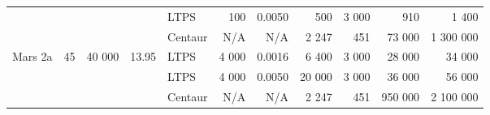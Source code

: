 \documentclass[final,3p,times,twocolumn,sort&compress, lefttitle]{elsarticle}
\begin{document}
\begin{table*}[t]
\begin{tabular}{@{}lrrrlrrrrrr@{}}
                                     &                                                           &                         &                                                                 & LTPS                                                        & 100                                                      & 0.0050                                                         & 500                    & 3 000                 & 910                                                                       & 1 400                                                                    \\
                                     &                                                           &                         &                                                                 & Centaur                                                     & N/A                                                         &  N/A                                                              & 2 247                  & 451                   & 73 000                                                                    & 1 300 000                                                                \\ \midrule
            \multirow{3}{*}{Mars 2a} & \multirow{3}{*}{45}                                       & \multirow{3}{*}{40 000} & \multirow{3}{*}{13.95}                                          & LTPS                                                        & 4 000                                                    & 0.0016                                                         & 6 400                  & 3 000                  & 28 000                                                                    & 34 000                                                                   \\
                                     &                                                           &                         &                                                                 & LTPS                                                        & 4 000                                                    & 0.0050                                                         & 20 000                 & 3 000                  & 36 000                                                                    & 56 000                                                                   \\
                                     &                                                           &                         &                                                                 & Centaur                                                     &  N/A                                                        &  N/A                                                              & 2 247                  & 451                   & 950 000                                                                   & 2 100 000                                                                \\ \midrule

\end{tabular}
\end{table*}
\end{document}
